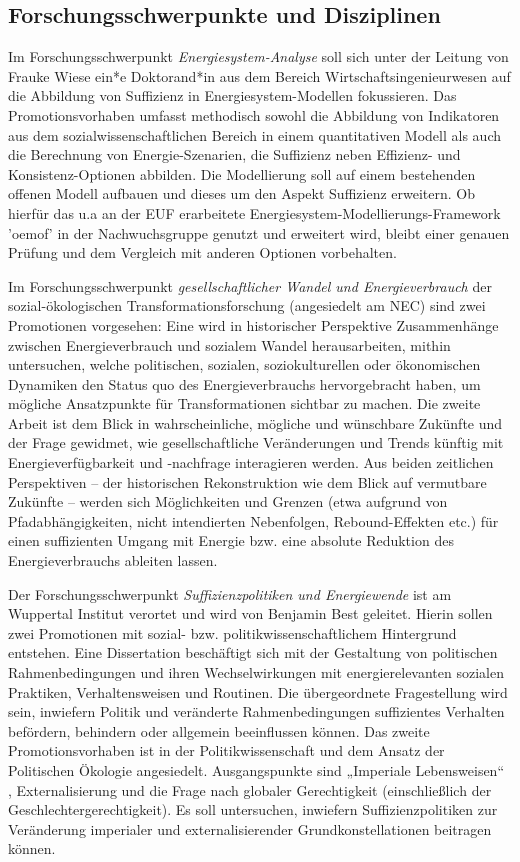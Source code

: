 \documentclass[a4paper,11pt,twoside]{scrartcl}
\begin{document}
\subsection{Forschungsschwerpunkte und Disziplinen}
Im Forschungsschwerpunkt \textit{Energiesystem-Analyse} soll sich unter der Leitung von Frauke Wiese ein*e Doktorand*in aus dem Bereich Wirtschaftsingenieurwesen auf die Abbildung von Suffizienz in Energiesystem-Modellen fokussieren. Das Promotionsvorhaben umfasst methodisch sowohl die Abbildung von Indikatoren aus dem sozialwissenschaftlichen Bereich in einem quantitativen Modell als auch die Berechnung von Energie-Szenarien, die Suffizienz neben Effizienz- und Konsistenz-Optionen abbilden. Die Modellierung soll auf einem bestehenden offenen Modell aufbauen und dieses um den Aspekt Suffizienz erweitern. Ob hierfür das u.a an der EUF erarbeitete Energiesystem-Modellierungs-Framework 'oemof' in der Nachwuchsgruppe genutzt und erweitert wird, bleibt einer genauen Prüfung und dem Vergleich mit anderen Optionen vorbehalten.

Im Forschungsschwerpunkt \textit{gesellschaftlicher Wandel und Energieverbrauch} der sozial-ökologischen Transformationsforschung (angesiedelt am NEC) sind zwei Promotionen vorgesehen: Eine wird in historischer Perspektive Zusammenhänge zwischen Energieverbrauch und sozialem Wandel herausarbeiten, mithin untersuchen, welche politischen, sozialen, soziokulturellen oder ökonomischen Dynamiken den Status quo des Energieverbrauchs hervorgebracht haben, um mögliche Ansatzpunkte für Transformationen sichtbar zu machen. Die zweite Arbeit ist dem Blick in wahrscheinliche, mögliche und wünschbare Zukünfte \cite{Kreibich2008} und der Frage gewidmet, wie gesellschaftliche Veränderungen und Trends künftig mit Energieverfügbarkeit und -nachfrage interagieren werden. Aus beiden zeitlichen Perspektiven – der historischen Rekonstruktion wie dem Blick auf vermutbare Zukünfte – werden sich Möglichkeiten und Grenzen (etwa aufgrund von Pfadabhängigkeiten, nicht intendierten Nebenfolgen, Rebound-Effekten etc.) für einen suffizienten Umgang mit Energie bzw. eine absolute Reduktion des Energieverbrauchs ableiten lassen.

Der Forschungsschwerpunkt \textit{Suffizienzpolitiken und Energiewende} ist am Wuppertal Institut verortet und wird von Benjamin Best geleitet. Hierin sollen zwei Promotionen mit sozial- bzw. politikwissenschaftlichem Hintergrund entstehen. Eine Dissertation beschäftigt sich mit der Gestaltung von politischen Rahmenbedingungen und ihren Wechselwirkungen mit energierelevanten sozialen Praktiken, Verhaltensweisen und Routinen. Die übergeordnete Fragestellung wird sein, inwiefern Politik und veränderte Rahmenbedingungen suffizientes Verhalten befördern, behindern oder allgemein beeinflussen können. Das zweite Promotionsvorhaben ist in der Politikwissenschaft und dem Ansatz der Politischen Ökologie angesiedelt. Ausgangspunkte sind „Imperiale Lebensweisen“ \cite{Brand2017}, Externalisierung \cite{Lessenich2016,BieseckerOJ} und die Frage nach globaler Gerechtigkeit (einschließlich der Geschlechtergerechtigkeit). Es soll untersuchen, inwiefern Suffizienzpolitiken zur Veränderung imperialer und externalisierender Grundkonstellationen beitragen können.
\end{document}
